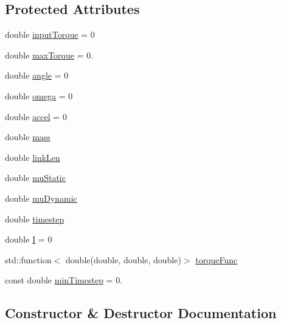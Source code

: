 \subsection*{Protected Attributes}
\begin{DoxyCompactItemize}
\item 
double \mbox{\hyperlink{classokapi_1_1FlywheelSimulator_aa26b15b655c310e4d5bd523c22282e17}{input\+Torque}} = 0
\item 
double \mbox{\hyperlink{classokapi_1_1FlywheelSimulator_a8f3de956054f3f064cb8468bbda467b9}{max\+Torque}} = 0.
\item 
double \mbox{\hyperlink{classokapi_1_1FlywheelSimulator_ab52c0add6fc410b93ce91ff29bf3c85b}{angle}} = 0
\item 
double \mbox{\hyperlink{classokapi_1_1FlywheelSimulator_aaf02971fd228412b827a7514c664c078}{omega}} = 0
\item 
double \mbox{\hyperlink{classokapi_1_1FlywheelSimulator_ae5fbfc008c5202fa9557087594d99e2b}{accel}} = 0
\item 
double \mbox{\hyperlink{classokapi_1_1FlywheelSimulator_a889583a4674ea4e9a611c88a621deb3b}{mass}}
\item 
double \mbox{\hyperlink{classokapi_1_1FlywheelSimulator_a3e1430492589bb052afcf0786a243f60}{link\+Len}}
\item 
double \mbox{\hyperlink{classokapi_1_1FlywheelSimulator_aec46d7de7c61b9044e2896d3c0286eb1}{mu\+Static}}
\item 
double \mbox{\hyperlink{classokapi_1_1FlywheelSimulator_a6b9c0debb701ee44b3fed2122b16c7c7}{mu\+Dynamic}}
\item 
double \mbox{\hyperlink{classokapi_1_1FlywheelSimulator_aee4eecf39f0784452187154037a5acd2}{timestep}}
\item 
double \mbox{\hyperlink{classokapi_1_1FlywheelSimulator_af430f8063f09f5fae458b79a9119c4ae}{I}} = 0
\item 
std\+::function$<$ double(double, double, double)$>$ \mbox{\hyperlink{classokapi_1_1FlywheelSimulator_a84b1705cb4bcc8569e1a5f738ae7c129}{torque\+Func}}
\item 
const double \mbox{\hyperlink{classokapi_1_1FlywheelSimulator_a3dd7deba7fc63abb081143eec38bfc76}{min\+Timestep}} = 0.
\end{DoxyCompactItemize}


\subsection{Constructor \& Destructor Documentation}
\mbox{\label{classokapi_1_1FlywheelSimulator_a8c7b4a6d86c64b3a5ec7e95b82b3486d}} 
